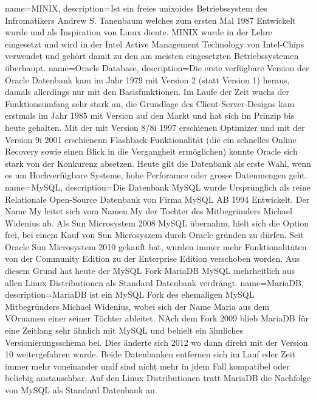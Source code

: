 {
        name=MINIX,
        description={Ist ein freies unixoides Betriebssystem des Infromatikers Andrew S. Tanenbaum welches zum ersten Mal 1987 Entwickelt wurde und als Inspiration von Linux diente.
        MINIX wurde in der Lehre eingesetzt und wird in der Intel Active Management Technology von Intel-Chips verwendet und gehört damit zu den am meisten eingesetzten Betriebssystemen überhaupt.}
}
{
        name=Oracle Database,
        description={Die erste verfügbare Version der Oracle Datenbank kam im Jahr 1979 mit Version 2 (statt Version 1) heraus, damals allerdings nur mit den Basisfunktionen.
        Im Laufe der Zeit wuchs der Funktionsumfang sehr stark an, die Grundlage des Client-Server-Designs kam erstmals im Jahr 1985 mit Version auf den Markt und hat sich im Prinzip bis heute gehalten.
        Mit der mit Version 8/8i 1997 erschienen Optimizer und mit der Version 9i 2001 erschienenn Flashback-Funktionalität (die ein schnelles Online Recovery sowie einen Blick in die Vergangheit ermöglichen) konnte Oracle sich stark von der Konkurenz absetzen.
        Heute gilt die Datenbank als erste Wahl, wenn es um Hochverfügbare Systeme, hohe Perforamce oder grosse Datenmengen geht.}
}
{
        name=MySQL,
        description={Die Datenbank MySQL wurde Ursprünglich als reine Relationale Open-Source Datenbank von Firma MySQL AB 1994 Entwickelt.
        Der Name My leitet sich vom Namen My der Tochter des Mitbegründers Michael Widenius ab.
        Als Sun Microsystem 2008 MySQL übernahm, hielt sich die Option frei, bei einem Kauf von Sun Microsyszem durch Oracle gründen zu dürfen.
        Seit Oracle Sun Microsystem 2010 gekauft hat, wurden immer mehr Funktionalitäten von der Community Edition zu der Enterprise Edition verschoben worden.
        Aus diesem Grund hat heute der MySQL Fork MariaDB MySQL mehrheitlich aus allen Linux Distributionen als Standard Datenbank verdrängt.}
}
{
        name=MariaDB,
        description={MariaDB ist ein MySQL Fork des ehemaligen MySQL Mitbegründers Michael Widenius, wobei sich der Name Maria aus dem VOrnamen einer seiner Töchter ableitet.
        NAch dem Fork 2009 blieb MariaDB für eine Zeitlang sehr ähnlich mit MySQL und behielt ein ähnliches Versionierungsschema bei.
        Dies änderte sich 2012 wo dann direkt mit der Version 10 weitergefahren wurde.
        Beide Datenbanken entfernen sich im Lauf eder Zeit immer mehr voneinander undf sind nicht mehr in jdem Fall kompatibel oder beliebig austauschbar.
        Auf den Linux Distributionen tratt MariaDB die Nachfolge von MySQL als Standard Datenbank an.}
}
